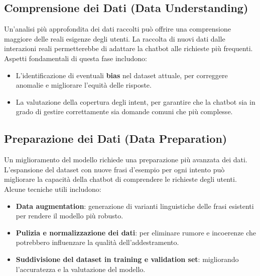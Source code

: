 \documentclass[12pt, letterpaper]{article}
\begin{document}
\subsection{Comprensione dei Dati (Data Understanding)}
Un'analisi più approfondita dei dati raccolti può offrire una comprensione maggiore delle reali esigenze degli utenti. La raccolta di nuovi dati dalle interazioni reali permetterebbe di adattare la chatbot alle richieste più frequenti.\\
Aspetti fondamentali di questa fase includono:
\begin{itemize}
	\item L’identificazione di eventuali \textbf{bias} nel dataset attuale, per correggere anomalie e migliorare l'equità delle risposte.
	\item La valutazione della copertura degli intent, per garantire che la chatbot sia in grado di gestire correttamente sia domande comuni che più complesse.
\end{itemize}

\subsection{Preparazione dei Dati (Data Preparation)}
Un miglioramento del modello richiede una preparazione più avanzata dei dati. L'espansione del dataset con nuove frasi d’esempio per ogni intento può migliorare la capacità della chatbot di comprendere le richieste degli utenti.\\
Alcune tecniche utili includono:
\begin{itemize}
	\item \textbf{Data augmentation}: generazione di varianti linguistiche delle frasi esistenti per rendere il modello più robusto.
	\item \textbf{Pulizia e normalizzazione dei dati}: per eliminare rumore e incoerenze che potrebbero influenzare la qualità dell’addestramento.
	\item \textbf{Suddivisione del dataset in training e validation set}: migliorando l'accuratezza e la valutazione del modello.
\end{itemize}
\end{document}
